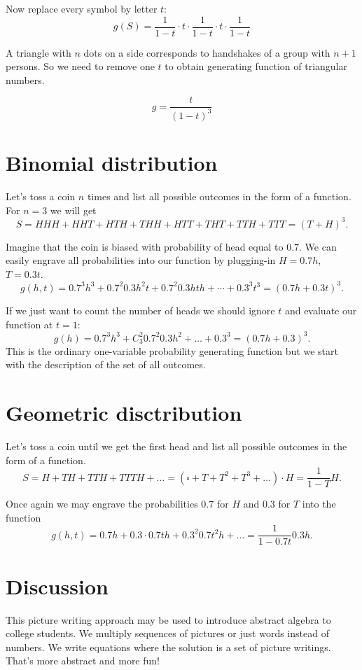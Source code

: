 \documentclass{article}
\begin{document}
Now replace every symbol by letter $t$:
\[
g(S) = 	\frac{1}{1-t} \cdot  t \cdot  \frac{1}{1-t} \cdot t \cdot \frac{1}{1-t} 
\]


A triangle with $n$ dots on a side corresponds to handshakes of a group with $n+1$ persons.
So we need to remove one $t$ to obtain generating function of triangular numbers.

\[
g = \frac{t}{(1-t)^3}
\]


\section{Binomial distribution}

Let's toss a coin $n$ times and list all possible outcomes in the form of a function.
For $n=3$ we will get
\[
S = HHH + HHT + HTH + THH + HTT + THT + TTH + TTT = (T + H)^3.
\]

Imagine that the coin is biased with probability of head equal to $0.7$. 
We can easily engrave all probabilities into our function by plugging-in $H=0.7h$, $T=0.3t$.
\[
g(h, t) = 0.7^3 h^3 + 0.7^2 0.3 h^2 t + 0.7^2 0.3 hth + \cdots + 0.3^3 t^3 = (0.7 h + 0.3t)^3.
\]

If we just want to count the number of heads we should ignore $t$ and evaluate our function at $t=1$:
\[
g(h) = 0.7^3 h^3 + C_3^2 0.7^2 0.3 h^2 + \ldots + 0.3^3 = (0.7h + 0.3)^3. 
\]
This is the ordinary one-variable probability generating function but we start with the description of 
the set of all outcomes. 


\section{Geometric disctribution}

Let's toss a coin until we get the first head and list all possible outcomes in the form of a function.
\[
S = H + TH + TTH + TTTH + \ldots = (\square + T + T^2 + T^3 + \ldots) \cdot H = \frac{1}{1-T} H.
\]

Once again we may engrave the probabilities $0.7$ for $H$ and $0.3$ for $T$ into the function 
\[
g(h, t) = 0.7h + 0.3\cdot 0.7 th + 0.3^2 0.7 t^2 h +\ldots = \frac{1}{1-0.7t}0.3h.
\]



\section{Discussion}


This picture writing approach may be used to introduce abstract algebra to college students. 
We multiply sequences of pictures or just words instead of numbers. 
We write equations where the solution is a set of picture writings. 
That's more abstract and more fun!
\end{document}
